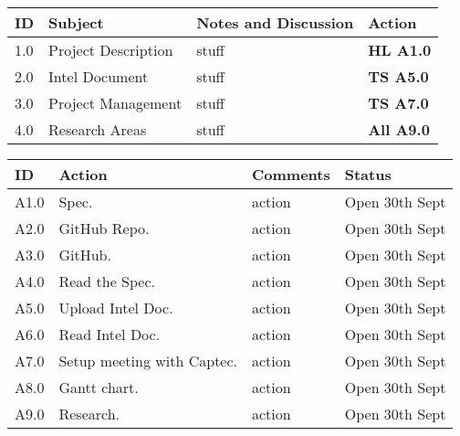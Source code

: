 \documentclass{elec6049Report}     %
\begin{document}
\begin{center}
\begin{longtable}{| p{} |>{\raggedright\arraybackslash}p{} | p{} |>{\raggedright\arraybackslash}p{}|} \hline
\textbf{ID} & \textbf{Subject} & \textbf{Notes and Discussion} & \textbf{Action} \\ \hline
\endhead
1.0	&	Project Description	&	stuff	&	\textbf{HL A1.0} \\ \hline
2.0	&	Intel Document	&	stuff	&	\textbf{TS A5.0} \\ \hline
3.0	&	Project Management	&	stuff &	\textbf{TS A7.0} \\ \hline
4.0	&	Research Areas	&	stuff &	\textbf{All A9.0} \\ \hline


\end{longtable}
\end{center}

\begin{center}
\begin{longtable}{| p{} | >{\raggedright\arraybackslash}p{} |  p{} | >{\raggedright\arraybackslash}p{}|} \hline
\textbf{ID} & \textbf{Action} & \textbf{Comments} & \textbf{Status} \\ \hline
\endhead
A1.0	&	 Spec.	&	action 	& Open 30th Sept \\ \hline
A2.0	&	GitHub Repo.	&	action	&	Open 30th Sept \\ \hline
A3.0	&	GitHub.		&	action	&	Open 30th Sept	\\ \hline
A4.0	&	Read the Spec.	&	action	&	Open 30th Sept \\ \hline
A5.0	&	Upload Intel Doc.	&	action	&	Open 30th Sept \\ \hline
A6.0	&	Read Intel Doc.	&	action	&	Open 30th Sept \\ \hline
A7.0	&	Setup meeting with Captec.	&	action	&	Open 30th Sept \\ \hline
A8.0	&	Gantt chart.	&	action	&	Open 30th Sept	\\ \hline
A9.0	&	Research.&	action  &	Open 30th Sept	\\ \hline	
\end{longtable}
\end{center}


\clearpage
\end{document}
